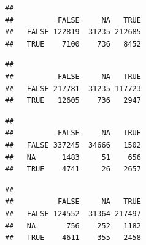 \documentclass[
]{book}
\newenvironment{Shaded}{\begin{snugshade}}{\end{snugshade}}
\newcommand{\CommentTok}[1]{\textcolor[rgb]{0.56,0.35,0.01}{\textit{#1}}}
\newcommand{\KeywordTok}[1]{\textcolor[rgb]{0.13,0.29,0.53}{\textbf{#1}}}
\newcommand{\NormalTok}[1]{#1}
\newcommand{\OperatorTok}[1]{\textcolor[rgb]{0.81,0.36,0.00}{\textbf{#1}}}
\begin{document}
\begin{Shaded}
\end{Shaded}

\begin{verbatim}
##        
##          FALSE     NA   TRUE
##   FALSE 122819  31235 212685
##   TRUE    7100    736   8452
\end{verbatim}

\begin{Shaded}
\end{Shaded}

\begin{verbatim}
##        
##          FALSE     NA   TRUE
##   FALSE 217781  31235 117723
##   TRUE   12605    736   2947
\end{verbatim}

\begin{Shaded}
\end{Shaded}

\begin{verbatim}
##        
##          FALSE     NA   TRUE
##   FALSE 337245  34666   1502
##   NA      1483     51    656
##   TRUE    4741     26   2657
\end{verbatim}

\begin{Shaded}
\end{Shaded}

\begin{verbatim}
##        
##          FALSE     NA   TRUE
##   FALSE 124552  31364 217497
##   NA       756    252   1182
##   TRUE    4611    355   2458
\end{verbatim}
\end{document}
